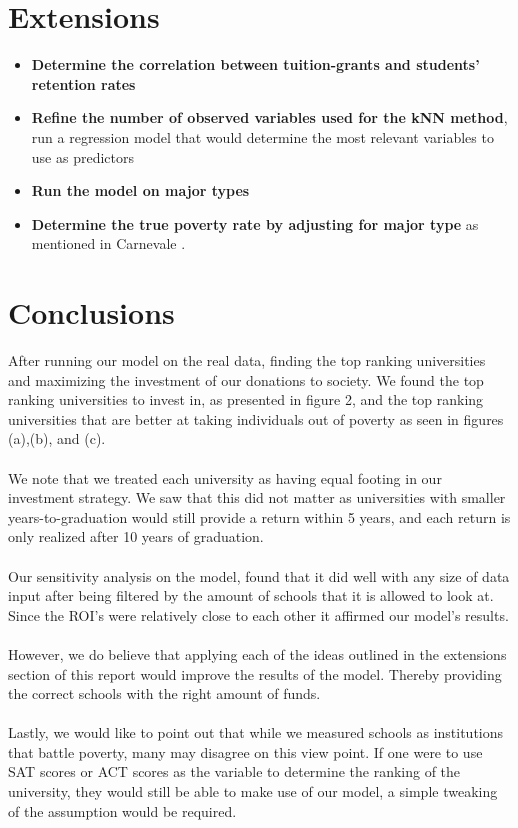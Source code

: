 \documentclass[12pt]{scrartcl}
\begin{document}
\section{Extensions}
	\begin{itemize}
		\item \textbf{Determine the correlation between tuition-grants and students' retention rates}

		\item \textbf{Refine the number of observed variables used for the kNN method}, run a regression model that would determine the most relevant variables to use as predictors

		\item \textbf{Run the model on major types}

		\item \textbf{Determine the true poverty rate by adjusting for major type} as mentioned in Carnevale \cite{Carnevale}.
	\end{itemize}

\section{Conclusions}

	After running our model on the real data, finding the top ranking universities and maximizing the investment of our donations to society. We found the top ranking universities to invest in, as presented in figure 2, and the top ranking universities that are better at taking individuals out of poverty as seen in figures (a),(b), and (c).\\
	\\
	We note that we treated each university as having equal footing in our investment strategy. We saw that this did not matter	as universities with smaller years-to-graduation would still provide a return within 5 years, and each return is only realized after 10 years of graduation.\\
	\\	
	Our sensitivity analysis on the model, found that it did well with any size of data input after being filtered by the amount of schools that it is allowed to look at. Since the ROI's were relatively close to each other it affirmed our model's results.\\
	\\
	However, we do believe that applying each of the ideas outlined in the extensions section of this report would improve the results of the model. Thereby providing the correct schools with the right amount of funds.\\
	\\
	Lastly, we would like to point out that while we measured schools as institutions that battle poverty, many may disagree on this view point. If one were to use SAT scores or ACT scores as the variable to determine the ranking of the university, they would still be able to make use of our model, a simple tweaking of the assumption would be required.
\clearpage
\end{document}
